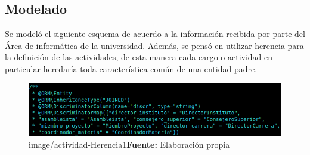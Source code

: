 \documentclass{article}
\begin{document}
\subsection{Modelado}%
\label{sub:modelado}
Se modeló el siguiente esquema de acuerdo a la información recibida por parte del Área de informática de la universidad. Además, se pensó en utilizar herencia para la definición de las actividades, de esta manera cada cargo o actividad en particular heredaría toda característica común de una entidad padre.
\begin{figure}[h]
    \includegraphics[width=1.2\linewidth]{image/actividad-herencia1.png}
    \caption{image/actividad-Herencia1\newline \textbf{Fuente:} Elaboración propia}%
    \label{fig:image/actividad-herencia1}
\end{figure}

\printbibliography
\end{document}
